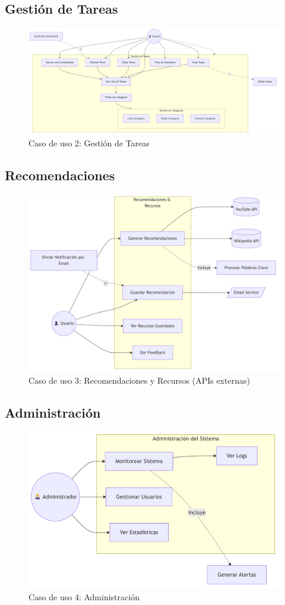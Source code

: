 \documentclass{pretexto/report}
\begin{document}
\subsection{Gestión de Tareas}
\begin{figure}[H]
    \centering
    \includegraphics[width=0.9\linewidth]{pngs/uc_2.png}
    \caption{Caso de uso 2: Gestión de Tareas}
\end{figure}
\subsection{Recomendaciones}
\begin{figure}[H]
    \centering
    \includegraphics[width=0.7\linewidth]{pngs/uc_3.png}
    \caption{Caso de uso 3: Recomendaciones y Recursos (APIs externas)}
\end{figure}
\subsection{Administración}
\begin{figure}[H]
    \centering
    \includegraphics[width=0.7\linewidth]{pngs/uc_4.png}
    \caption{Caso de uso 4: Administración}
\end{figure}
\end{document}
